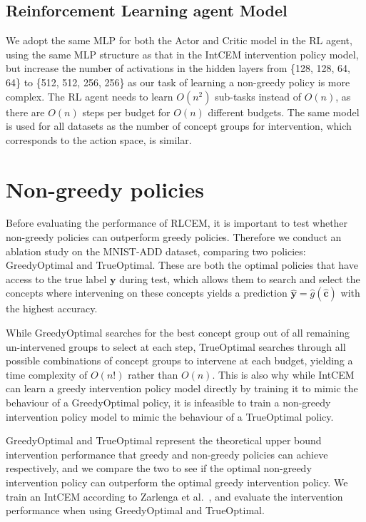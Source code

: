 \subsection{Reinforcement Learning agent Model}
We adopt the same MLP for 
both the Actor and Critic model in the RL agent, 
using the same MLP structure as that in the IntCEM intervention policy model,
but increase the number of activations in the hidden layers
 from \{128, 128, 64, 64\} to \{512, 512, 256, 256\} as
 our task of learning a non-greedy policy is more complex.
 The RL agent needs to learn 
 $O(n^2)$ sub-tasks instead of $O(n)$, as there are $O(n)$ 
steps per budget for $O(n)$ different budgets.
 The same model is used
 for all datasets as the number of concept groups for intervention,
 which corresponds to the action space,
 is similar. 
    
\section{Non-greedy policies}

Before evaluating the performance of RLCEM, it is important to test whether
non-greedy policies can outperform greedy policies. 
Therefore we conduct an
ablation study on the MNIST-ADD dataset, comparing two policies:
GreedyOptimal and TrueOptimal.
These are both the optimal policies that have access to the true label $\mathbf{y}$ during test, which 
allows them to search and select the concepts
where intervening on these concepts yields a prediction
$\hat{\mathbf{y}} = \hat{g}(\hat{\mathbf{c}})$ 
with the highest accuracy.

While GreedyOptimal searches for 
the best concept group
out of all remaining un-intervened groups
to select at each step, TrueOptimal searches through
all possible combinations of concept groups to intervene at each budget, yielding
a time complexity of $O(n!)$ rather than
$O(n)$. This is also why while IntCEM can 
learn a greedy intervention policy model directly
by training it to mimic the behaviour of a GreedyOptimal 
policy, it is infeasible to train a non-greedy intervention policy
model to mimic the behaviour of a TrueOptimal policy.

GreedyOptimal and TrueOptimal represent the theoretical
upper bound intervention performance
that greedy and non-greedy policies can achieve respectively,
and we compare the two to see if the optimal 
non-greedy intervention policy can outperform the 
optimal greedy
intervention policy.
We train an IntCEM according to Zarlenga et al.~\cite{intcem}, 
and evaluate the intervention performance when using
GreedyOptimal and TrueOptimal. 

